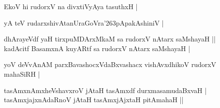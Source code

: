 \begin{entry}
\begin{shl}
EkoV hi rudorxV na divxtiVyAya tasuthxH |
\end{shl}
\begin{shl}
yA teV rudarxshivAtanUraGoVra{\char'263}pApakAshiniV |
\end{shl}
\begin{shl}
dhArayeVdf yaH tirxpuMDArxMkaM sa rudorxV nAtarx saMshayaH ||\\
kadAcitf BasamxnA kuyARtf sa rudorxV nAtarx saMshayaH |
\end{shl}
\begin{shl}
yoV deVvAnAM parxBavashocxVdaBxvashacx vishAvxdhikoV rudorxV mahaSiRH |
\end{shl}
\begin{shl}
tasAmxnAmxheVshavxroV jAtaH tasAmxdf durxmasamudaBxvaH |\\
tasAmxjajxnAdaRnoV jAtaH tasAmxjAjxtaH pitAmahaH ||
\end{shl}


\end{entry}
